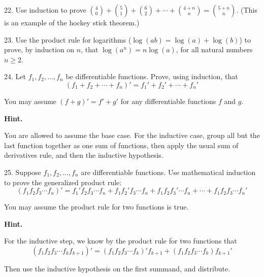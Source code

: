 \documentclass[10pt,]{book}
\theoremstyle{plain}
\theoremstyle{definition}
\numberwithin{equation}{chapter}
\begin{document}
\begin{exerciselist}
\item[22.]\hypertarget{exercise-205}{}
          Use induction to prove \({4 \choose 0} + {5 \choose 1} + {6 \choose 2} + \cdots + {4+n \choose n} = {5+n \choose n}\). (This is an example of the hockey stick theorem.)
\par\smallskip
\item[23.]\hypertarget{exercise-206}{}
          Use the product rule for logarithms (\(\log(ab) = \log(a) + \log(b)\)) to prove, by induction on \(n\), that \(\log(a^n) = n \log(a)\), for all natural numbers \(n \ge 2\).
\par\smallskip
\item[24.]\hypertarget{exercise-207}{}
          Let \(f_1, f_2,\ldots, f_n\) be differentiable functions. Prove, using induction, that
          \begin{equation*}
            (f_1 + f_2 + \cdots + f_n)' = f_1' + f_2' + \cdots + f_n'
          \end{equation*}
\par

          You may assume \((f+g)' = f' + g'\) for any differentiable functions \(f\) and \(g\).
\par\smallskip
\par\smallskip
\noindent\textbf{Hint.}\hypertarget{hint-10}{}\quad

          You are allowed to assume the base case. For the inductive case, group all but the last function together as one sum of functions, then apply the usual sum of derivatives rule, and then the inductive hypothesis.
\item[25.]\hypertarget{exercise-208}{}
          Suppose \(f_1, f_2, \ldots, f_n\) are differentiable functions. Use mathematical induction to prove the generalized product rule:
          \begin{equation*}
            (f_1 f_2 f_3 \cdots f_n)' = f_1' f_2 f_3 \cdots f_n + f_1 f_2' f_3 \cdots f_n + f_1 f_2 f_3' \cdots f_n + \cdots + f_1 f_2 f_3 \cdots f_n'
          \end{equation*}
\par

          You may assume the product rule for two functions is true.
\par\smallskip
\par\smallskip
\noindent\textbf{Hint.}\hypertarget{hint-11}{}\quad

          For the inductive step, we know by the product rule for two functions that
          \begin{equation*}
            (f_1f_2f_3 \cdots f_k f_{k+1})' = (f_1f_2f_3\cdots f_k)'f_{k+1} + (f_1f_2f_3\cdots f_k)f_{k+1}'
          \end{equation*}
\par

          Then use the inductive hypothesis on the first summand, and distribute.
\end{exerciselist}
\typeout{************************************************}
\typeout{************************************************}
\end{document}
